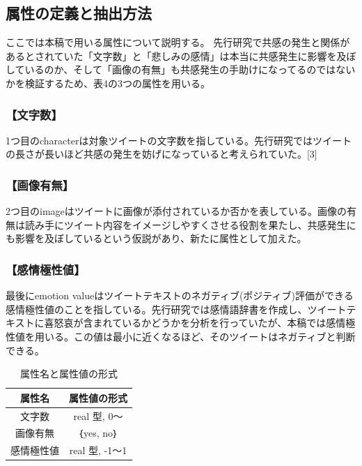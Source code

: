 \documentclass[dvipdfmx]{issj}
\begin{document}
\subsection{属性の定義と抽出方法}  %
ここでは本稿で用いる属性について説明する。
先行研究で共感の発生と関係があるとされていた「文字数」と「悲しみの感情」は本当に共感発生に影響を及ぼしているのか、そして「画像の有無」も共感発生の手助けになってるのではないかを検証するため、表4の3つの属性を用いる。


\subsubsection{【文字数】}
1つ目のcharacterは対象ツイートの文字数を指している。先行研究ではツイートの長さが長いほど共感の発生を妨げになっていると考えられていた。[3]

\subsubsection{【画像有無】}
2つ目のimageはツイートに画像が添付されているか否かを表している。画像の有無は読み手にツイート内容をイメージしやすくさせる役割を果たし、共感発生にも影響を及ぼしているという仮説があり、新たに属性として加えた。

\subsubsection{【感情極性値】}
最後にemotion valueはツイートテキストのネガティブ(ポジティブ)評価ができる感情極性値のことを指している。先行研究では感情語辞書を作成し、ツイートテキストに喜怒哀が含まれているかどうかを分析を行っていたが、本稿では感情極性値を用いる。この値は最小に近くなるほど、そのツイートはネガティブと判断できる。

\begin{table}[t]\centering
\caption{属性名と属性値の形式}\label{tbl:font}
\begin{small}
\begin{tabular}{|c|c|} \hline
属性名            & 属性値の形式\\\hline\hline
文字数         & real 型, 0～\\\hline
画像有無 & ｛yes, no｝\\\hline
感情極性値     &  real 型, -1～1\\\hline
\end{tabular}
\end{small}
\end{table}
\end{document}
